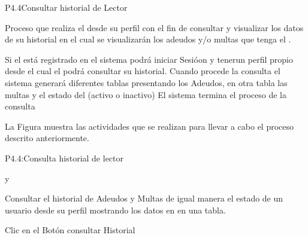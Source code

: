
\begin{Proceso}{P4.4}{Consultar historial de Lector} {
  

  Proceso que realiza el  desde su perfil con el fin de consultar y visualizar los datos de su historial en el cual se visualizarán los adeudos y/o multas que tenga el .
  
Si el  está registrado en el sistema podrá iniciar Sesióon y tenerun perfil propio desde el cual el  podrá consultar su historial.
Cuando procede la consulta el sistema generará diferentes tablas presentando los Adeudos, en otra tabla las multas y el estado del (activo o inactivo)
El sistema termina el proceso de la consulta 



  \noindent La Figura  muestra las actividades que se realizan para llevar a cabo el proceso descrito anteriormente.


} {P4.4:Consulta historial de lector}


   { %
     y 
  }

   { %
    Consultar el historial de Adeudos y Multas de igual manera el estado de un usuario desde su perfil mostrando los datos en en una tabla.
  }

   { %
  	\begin{UClist}
  		\UCli Clic en el Botón consultar Historial
    \end {UClist}
  }
  
   { %
  }


\end{Proceso}
